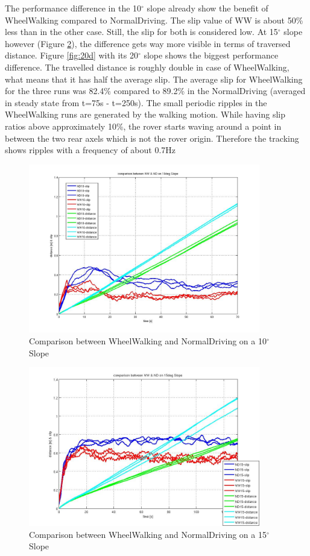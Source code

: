 \documentclass[a4paper,twocolumn]{esapub2005} %
\begin{document}
The performance difference in the 10$^\circ$ slope already show the benefit of WheelWalking compared to NormalDriving. The slip value of WW is about 50\% less than in the other case. Still, the slip for both is considered low.
At 15$^\circ$ slope however (Figure \ref{fig:15d}), the difference gets way more visible in terms of traversed distance. 
Figure \ref{fig:20d} with its 20$^\circ$ slope shows the biggest performance difference. The travelled distance is roughly double in case of WheelWalking, what means that it has half the average slip. The average slip for WheelWalking for the three runs was 82.4\% compared to 89.2\% in the NormalDriving (averaged in steady state from t=75s - t=250s). 
The small periodic ripples in the WheelWalking runs are generated by the walking motion. While having slip ratios above approximately 10\%, the rover starts waving around a point in between the two rear axels which is not the rover origin. Therefore the tracking shows ripples with a frequency of about 0.7Hz

\begin{figure}[h!]
	\centering		\includegraphics[width=0.9\textwidth]{10d.JPG}	
	\caption{Comparison between WheelWalking and NormalDriving on a 10$^{\circ}$ Slope}
	\label{fig:10d}
\end{figure}

\begin{figure}[h!]
	\centering		\includegraphics[width=0.9\textwidth]{15d.JPG}	
	\caption{Comparison between WheelWalking and NormalDriving on a 15$^{\circ}$ Slope}
	\label{fig:15d}
\end{figure}
\end{document}
